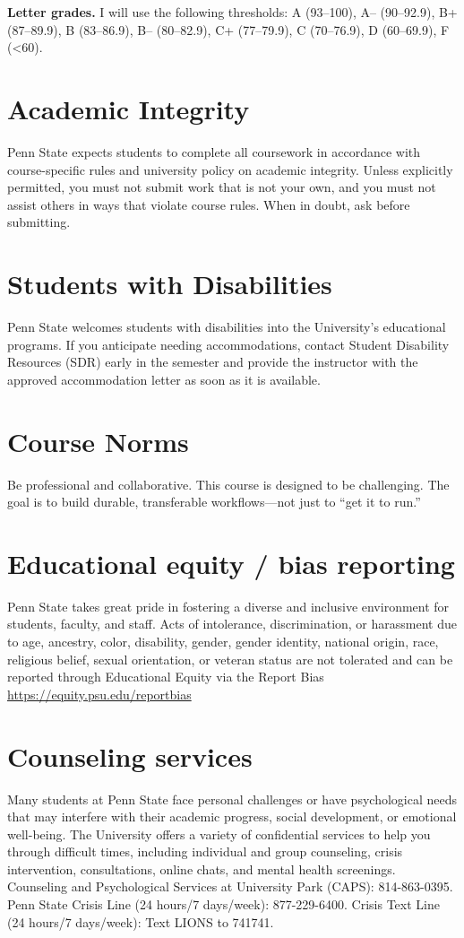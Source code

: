 \documentclass[letterpaper,11pt]{article}
\begin{document}
\noindent \textbf{Letter grades.} I will use the following thresholds: A (93--100), A-- (90--92.9), B+ (87--89.9), B (83--86.9), B-- (80--82.9), C+ (77--79.9), C (70--76.9), D (60--69.9), F (<60).

\section*{Academic Integrity}
Penn State expects students to complete all coursework in accordance with course-specific rules and university policy on academic integrity. Unless explicitly permitted, you must not submit work that is not your own, and you must not assist others in ways that violate course rules. When in doubt, ask before submitting.

\section*{Students with Disabilities}
Penn State welcomes students with disabilities into the University's educational programs. If you anticipate needing accommodations, contact Student Disability Resources (SDR) early in the semester and provide the instructor with the approved accommodation letter as soon as it is available.

\section*{Course Norms}
Be professional and collaborative. This course is designed to be challenging. The goal is to build durable, transferable workflows---not just to ``get it to run.''

\section*{Educational equity / bias reporting}

Penn State takes great pride in fostering a diverse and inclusive environment for students, faculty, and staff. Acts of intolerance, discrimination, or harassment due to age, ancestry, color, disability, gender, gender identity, national origin, race, religious belief, sexual orientation, or veteran status are not tolerated and can be reported through Educational Equity via the Report Bias \url{https://equity.psu.edu/reportbias}

\section*{Counseling services}
Many students at Penn State face personal challenges or have psychological needs that may interfere with their academic progress, social development, or emotional well-being. The University offers a variety of confidential services to help you through difficult times, including individual and group counseling, crisis intervention, consultations, online chats, and mental health screenings. Counseling and Psychological Services at University Park (CAPS): 814-863-0395. Penn State Crisis Line (24 hours/7 days/week): 877-229-6400. Crisis Text Line (24 hours/7 days/week): Text LIONS to 741741.
\end{document}
